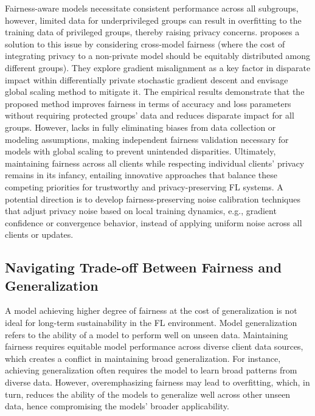 \documentclass{article}
\begin{document}
Fairness-aware models necessitate consistent performance across all subgroups, however, limited data for underprivileged groups can result in overfitting to the training data of privileged groups, thereby raising privacy concerns.  
\cite{esipova2023disparate} proposes a solution to this issue by considering cross-model fairness (where the cost of integrating privacy to a non-private model should be equitably distributed among different groups).
They explore gradient misalignment as a key factor in disparate impact within differentially private stochastic gradient descent and envisage global scaling method to mitigate it. The empirical results demonstrate that the proposed
method improves fairness in terms of accuracy and loss parameters without requiring protected groups' data and reduces disparate impact for all groups. However, lacks in fully eliminating biases from data collection or modeling assumptions, making independent fairness validation necessary for models with global scaling to prevent unintended disparities. Ultimately, maintaining fairness across all clients while respecting individual clients' privacy remains in its infancy, entailing innovative approaches that balance these competing priorities for trustworthy and privacy-preserving FL systems. A potential direction is to develop fairness-preserving noise calibration techniques that adjust privacy noise based on local training dynamics, e.g., gradient confidence or convergence behavior, instead of applying uniform noise across all clients or updates.
\subsection{Navigating Trade-off Between Fairness and Generalization}
\label{SubSec: Fairness and Generalization Tradeoffs}
A model achieving higher degree of fairness at the cost of generalization is not ideal for long-term sustainability in the FL environment. 
Model generalization refers to the ability of a model to perform well on unseen data. Maintaining fairness requires equitable model performance across diverse client data sources, which creates a conflict in maintaining broad generalization. 
For instance, achieving generalization often requires the model to learn broad patterns from diverse data. However, overemphasizing fairness may lead to overfitting, which, in turn, reduces the ability of the models to generalize well across other unseen data, hence compromising the models' broader applicability. 
\end{document}
